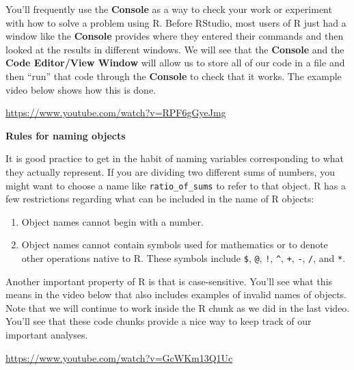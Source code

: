 \documentclass[]{tufte-book}
\providecommand{\tightlist}{%
  \setlength{\itemsep}{0pt}\setlength{\parskip}{0pt}}
\begin{document}
You'll frequently use the \textbf{Console} as a way to check your work or experiment with how to solve a problem using R. Before RStudio, most users of R just had a window like the \textbf{Console} provides where they entered their commands and then looked at the results in different windows. We will see that the \textbf{Console} and the \textbf{Code Editor/View Window} will allow us to store all of our code in a file and then ``run'' that code through the \textbf{Console} to check that it works. The example video below shows how this is done.

\vspace{0.1in}\begin{center}\footnotesize{\url{https://www.youtube.com/watch?v=RPF6gGyeJmg}}\end{center}\vspace{0.1in}

\vspace*{0.2in}

\noindent\textbf{Rules for naming objects}\vspace*{0.1in}

It is good practice to get in the habit of naming variables corresponding to what they actually represent. If you are dividing two different sums of numbers, you might want to choose a name like \texttt{ratio\_of\_sums} to refer to that object. R has a few restrictions regarding what can be included in the name of R objects:

\begin{enumerate}
\def\labelenumi{\arabic{enumi}.}
\tightlist
\item
  Object names cannot begin with a number.
\item
  Object names cannot contain symbols used for mathematics or to denote other operations native to R. These symbols include \texttt{\$}, \texttt{@}, \texttt{!}, \texttt{\^{}}, \texttt{+}, \texttt{-}, \texttt{/}, and \texttt{*}.
\end{enumerate}

Another important property of R is that is case-sensitive. You'll see what this means in the video below that also includes examples of invalid names of objects. Note that we will continue to work inside the R chunk as we did in the last video. You'll see that these code chunks provide a nice way to keep track of our important analyses.

\vspace{0.1in}\begin{center}\footnotesize{\url{https://www.youtube.com/watch?v=GcWKm13Q1Uc}}\end{center}\vspace{0.1in}
\end{document}
